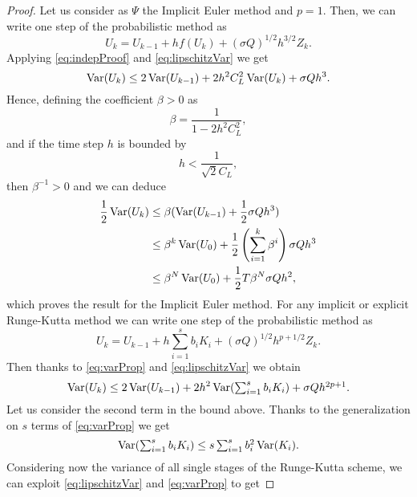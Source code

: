 \begin{proof} Let us consider as $\Psi$ the Implicit Euler method and $p = 1$. Then, we can write one step of the probabilistic method as
\begin{equation}
	U_{k} = U_{k-1} + hf(U_{k}) + (\sigma Q)^{1/2} h^{3/2}Z_k.
\end{equation}
Applying \eqref{eq:indepProof} and \eqref{eq:lipschitzVar} we get 
\begin{equation}
	\operatorname{Var}(U_k) \leq 2\operatorname{Var}(U_{k-1}) + 2h^2C_L^2 \operatorname{Var}(U_k) + \sigma Q h^3.
\end{equation}
Hence, defining the coefficient $\beta > 0$ as 
\begin{equation}
	\beta = \frac{1}{1 - 2h^2C_L^2}, 
\end{equation}
and if the time step $h$ is bounded by
\begin{equation}
	h < \frac{1}{\sqrt{2}C_L},
\end{equation}
then $\beta^{-1} > 0$ and we can deduce
\begin{equation}
\begin{aligned}
	\frac{1}{2}\operatorname{Var}(U_k) &\leq \beta(\operatorname{Var}(U_{k-1}) + \frac{1}{2}\sigma Q h^3) \\
	&\leq \beta^k \operatorname{Var}(U_0) + \frac{1}{2}\left(\sum_{i = 1}^{k} \beta^i\right) \sigma Q h^3 \\
	&\leq \beta^N \operatorname{Var}(U_0) + \frac{1}{2}T \beta^N \sigma Q h^2,
\end{aligned}
\end{equation}
which proves the result for the Implicit Euler method. For any implicit or explicit Runge-Kutta method we can write one step of the probabilistic method as
\begin{equation}
U_k = U_{k-1} + h\sum_{i=1}^{s}b_iK_i + (\sigma Q)^{1/2}h^{p + 1/2}Z_k.
\end{equation}
Then thanks to \eqref{eq:varProp} and \eqref{eq:lipschitzVar} we obtain
\begin{equation}\label{eq:partialLemRKI}
\operatorname{Var}(U_k) \leq 2 \operatorname{Var}(U_{k-1}) + 2h^2\operatorname{Var}(\textstyle\sum_{i=1}^{s}b_i K_i) + \sigma Q h^{2p + 1}.
\end{equation}
Let us consider the second term in the bound above. Thanks to the generalization on $s$ terms of \eqref{eq:varProp} we get
\begin{equation}
\operatorname{Var}(\textstyle \sum_{i=1}^{s}b_i K_i) \leq s \sum_{i=1}^s b_i^2 \operatorname{Var}(K_i).
\end{equation}
Considering now the variance of all single stages of the Runge-Kutta scheme, we can exploit \eqref{eq:lipschitzVar} and \eqref{eq:varProp} to get

\end{proof}
